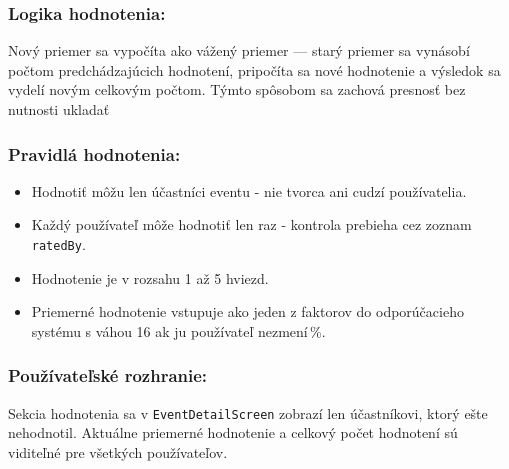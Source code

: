   \subsubsection{Logika hodnotenia:}
  Nový priemer sa vypočíta ako vážený priemer — starý priemer sa vynásobí počtom
  predchádzajúcich hodnotení, pripočíta sa nové hodnotenie a výsledok sa vydelí
  novým celkovým počtom. Týmto spôsobom sa zachová presnosť bez nutnosti ukladať



  \subsubsection{Pravidlá hodnotenia:}
  \begin{itemize}[noitemsep, nolistsep]
      \item Hodnotiť môžu len účastníci eventu - nie tvorca ani cudzí používatelia.
      \item Každý používateľ môže hodnotiť len raz - kontrola prebieha cez zoznam
            \texttt{ratedBy}.
      \item Hodnotenie je v rozsahu 1 až 5 hviezd.
      \item Priemerné hodnotenie vstupuje ako jeden z faktorov do odporúčacieho
            systému s váhou 16 ak ju používateľ nezmení\,\%.
  \end{itemize}

  \subsubsection{Používateľské rozhranie:}
  Sekcia hodnotenia sa v \texttt{EventDetailScreen} zobrazí len
  účastníkovi, ktorý ešte nehodnotil. Aktuálne priemerné hodnotenie a celkový
  počet hodnotení sú viditeľné pre všetkých používateľov.

